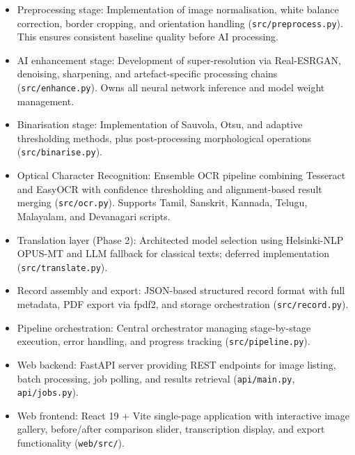 \begin{itemize}
	\item Preprocessing stage: Implementation of image normalisation, white balance correction, border cropping, and orientation handling (\texttt{src/preprocess.py}). This ensures consistent baseline quality before AI processing.
	
	\item AI enhancement stage: Development of super-resolution via Real-ESRGAN, denoising, sharpening, and artefact-specific processing chains (\texttt{src/enhance.py}). Owns all neural network inference and model weight management.
	
	\item Binarisation stage: Implementation of Sauvola, Otsu, and adaptive thresholding methods, plus post-processing morphological operations (\texttt{src/binarise.py}).
	
	\item Optical Character Recognition: Ensemble OCR pipeline combining Tesseract and EasyOCR with confidence thresholding and alignment-based result merging (\texttt{src/ocr.py}). Supports Tamil, Sanskrit, Kannada, Telugu, Malayalam, and Devanagari scripts.
	
	\item Translation layer (Phase 2): Architected model selection using Helsinki-NLP OPUS-MT and LLM fallback for classical texts; deferred implementation (\texttt{src/translate.py}).
	
	\item Record assembly and export: JSON-based structured record format with full metadata, PDF export via fpdf2, and storage orchestration (\texttt{src/record.py}).
	
	\item Pipeline orchestration: Central orchestrator managing stage-by-stage execution, error handling, and progress tracking (\texttt{src/pipeline.py}).
	
	\item Web backend: FastAPI server providing REST endpoints for image listing, batch processing, job polling, and results retrieval (\texttt{api/main.py}, \texttt{api/jobs.py}).
	
	\item Web frontend: React 19 + Vite single-page application with interactive image gallery, before/after comparison slider, transcription display, and export functionality (\texttt{web/src/}).
\end{itemize}

